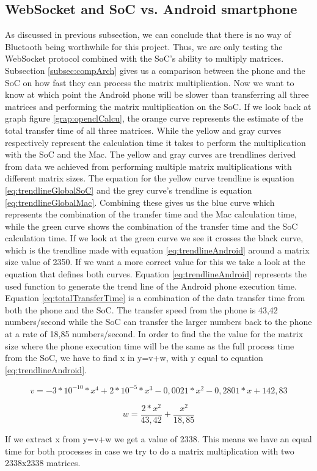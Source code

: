 \documentclass[a4paper, 11pt]{report}
\begin{document}
\subsection{WebSocket and SoC vs. Android smartphone}
As discussed in previous subsection, we can conclude that there is no way of Bluetooth being worthwhile for this project. Thus, we are only testing the WebSocket protocol combined with the SoC's ability to multiply matrices. Subsection \ref{subsec:compArch} gives us a comparison between the phone and the SoC on how fast they can process the matrix multiplication. Now we want to know at which point the Android phone will be slower than transferring all three matrices and performing the matrix multiplication on the SoC. If we look back at graph figure \ref{grap:openclCalcu}, the orange curve represents the estimate of the total transfer time of all three matrices. While the yellow and gray curves respectively represent the calculation time it takes to perform the multiplication with the SoC and the Mac. The yellow and gray curves are trendlines derived from data we achieved from performing multiple matrix multiplications with different matrix sizes. The equation for the yellow curve trendline is equation \ref{eq:trendlineGlobalSoC} and the grey curve's trendline is equation \ref{eq:trendlineGlobalMac}. Combining these gives us the blue curve which represents the combination of the transfer time and the Mac calculation time, while the green curve shows the combination of the transfer time and the SoC calculation time. If we look at the green curve we see it crosses the black curve, which is the trendline made with equation \ref{eq:trendlineAndroid} around a matrix size value of 2350. If we want a more correct value for this we take a look at the equation that defines both curves. Equation \ref{eq:trendlineAndroid} represents the used function to generate the trend line of the Android phone execution time. Equation \ref{eq:totalTransferTime} is a combination of the data transfer time from both the phone and the SoC. The transfer speed from the phone is 43,42 numbers/second while the SoC can transfer the larger numbers back to the phone at a rate of 18,85 numbers/second. In order to find the the value for the matrix size where the phone execution time will be the same as the full process time from the SoC, we have to find x in y=v+w, with y equal to equation \ref{eq:trendlineAndroid}.

\begin{equation} \label{eq:totalCalcTimeSoC}
v = -3*10^{-10}*x^4+2*10^{-5}*x^3-0,0021*x^2-0,2801*x+142,83
\end{equation}

\begin{equation} \label{eq:totalTransferTime}
w = \frac{2*x^2}{43,42}+\frac{x^2}{18,85}
\end{equation}

If we extract x from y=v+w we get a value of 2338. This means we have an equal time for both processes in case we try to do a matrix multiplication with two 2338x2338 matrices.




\end{document}
